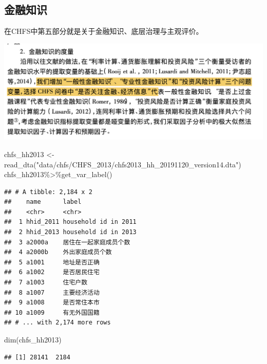 \documentclass[
  oneside]{book}
\newenvironment{Shaded}{\begin{snugshade}}{\end{snugshade}}
\newcommand{\FunctionTok}[1]{\textcolor[rgb]{0.00,0.00,0.00}{#1}}
\newcommand{\NormalTok}[1]{#1}
\newcommand{\OtherTok}[1]{\textcolor[rgb]{0.56,0.35,0.01}{#1}}
\newcommand{\SpecialCharTok}[1]{\textcolor[rgb]{0.00,0.00,0.00}{#1}}
\newcommand{\StringTok}[1]{\textcolor[rgb]{0.31,0.60,0.02}{#1}}
\begin{document}
\hypertarget{ux91d1ux878dux77e5ux8bc6}{%
\subsection{金融知识}\label{ux91d1ux878dux77e5ux8bc6}}

在CHFS中第五部分就是关于金融知识、底层治理与主观评价。

\includegraphics{image/fin-know.png}

\begin{Shaded}
\begin{Highlighting}[]
\NormalTok{chfs\_hh2013 }\OtherTok{\textless{}{-}} \FunctionTok{read\_dta}\NormalTok{(}\StringTok{"data/chfs/CHFS\_2013/chfs2013\_hh\_20191120\_version14.dta"}\NormalTok{)}
\NormalTok{chfs\_hh2013}\SpecialCharTok{\%\textgreater{}\%}\FunctionTok{get\_var\_label}\NormalTok{()}
\end{Highlighting}
\end{Shaded}

\begin{verbatim}
## # A tibble: 2,184 x 2
##    name      label                 
##    <chr>     <chr>                 
##  1 hhid_2011 household id in 2011  
##  2 hhid_2013 household id in 2013  
##  3 a2000a    居住在一起家庭成员个数
##  4 a2000b    外出家庭成员个数      
##  5 a1001     地址是否正确          
##  6 a1002     是否居民住宅          
##  7 a1003     住宅户数              
##  8 a1007     主要经济活动          
##  9 a1008     是否常住本市          
## 10 a1009     有无外国国籍          
## # ... with 2,174 more rows
\end{verbatim}

\begin{Shaded}
\begin{Highlighting}[]
\FunctionTok{dim}\NormalTok{(chfs\_hh2013)}
\end{Highlighting}
\end{Shaded}

\begin{verbatim}
## [1] 28141  2184
\end{verbatim}
\end{document}
